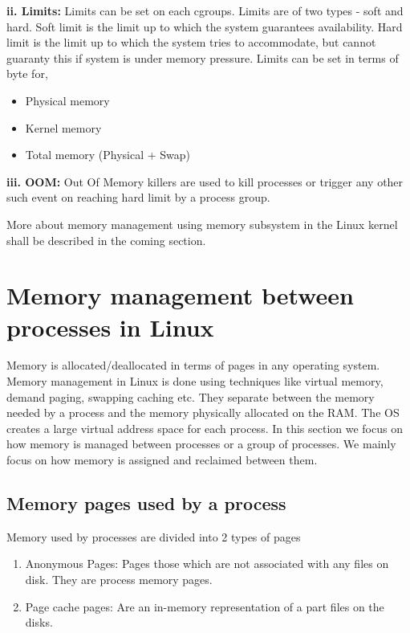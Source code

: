       \textbf{ii. Limits:} Limits can be set on each cgroups. Limits are of two types - soft and hard. Soft limit is the limit up to which 
the system guarantees availability. Hard limit is the limit up to which the system tries to accommodate, but cannot guaranty this if 
system is under memory pressure. Limits can be set in terms of byte for,
      \begin{itemize}
	\item Physical memory
	\item Kernel memory
	\item Total memory (Physical + Swap)
      \end{itemize}

      \textbf{iii. OOM:} Out Of Memory killers are used to kill processes or trigger any other such event on reaching hard limit by a 
process group. 

	More about memory management using memory subsystem in the Linux kernel shall be described in the coming section.
      
  \pagebreak
  
  \section{Memory management between processes in Linux}
  
    Memory is allocated/deallocated in terms of pages in any operating system. Memory management in Linux is done using techniques like 
virtual memory, demand paging, swapping caching etc. They separate between the memory needed by a process and the memory physically 
allocated on the RAM. The OS creates a large virtual address space for each process. In this section we focus on how memory is managed 
between processes or a group of processes. We mainly focus on how memory is assigned and reclaimed between them.  
  
    \subsection{Memory pages used by a process}
      Memory used by processes are divided into 2 types of pages	
      \begin{enumerate}	
	\item Anonymous Pages: Pages those which are not associated with any files on disk. They are process memory pages.
	\item Page cache pages: Are an in-memory representation of a part files on the disks.	
      \end{enumerate}
  
